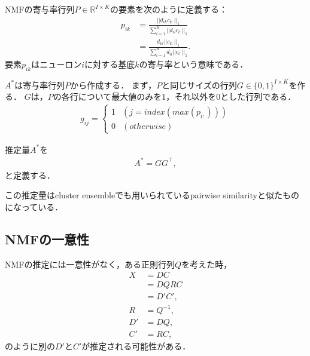 NMFの寄与率行列$P \in \mathbb{R}^{I \times K}$の要素を次のように定義する：
\begin{align}
	p_{ik} &= \frac{||d_{ik} c_{k:}||_1}{\sum_{l=1}^K || d_{il} c_{l:} ||_1} \\
	&= \frac{d_{ik} || c_{k:} ||_1}{ \sum_{l=1}^K d_{il} || c_{l:} ||_1 }.
\end{align}
要素$p_{ik}$はニューロン$i$に対する基底$k$の寄与率という意味である．

$A^*$は寄与率行列$P$から作成する．
まず，$P$と同じサイズの行列$G \in \{0, 1\}^{I \times K}$を作る．
$G$は，$P$の各行について最大値のみを$1$，それ以外を$0$とした行列である．
\begin{align}
	g_{ij} = \begin{cases}
		1 & (j = index(max(p_{i:}))) \\
		0 & (otherwise)
	\end{cases}
\end{align}

推定量$A^*$を
\begin{align}
	A^* = G G^{\top},
\end{align}
と定義する．

この推定量はcluster ensembleでも用いられているpairwise similarity\cite{Boongoen2018}と似たものになっている．

\subsection{NMFの一意性}
NMFの推定には一意性がなく，ある正則行列$Q$を考えた時，
\begin{align}
	X &= DC \\
	&= D Q R C \label{eq:dqrc} \\
	&= D'C', \\
	R &= Q^{-1}, \\
	D' &= DQ, \\
	C' &= RC,
\end{align}
のように別の$D'$と$C'$が推定される可能性がある．

